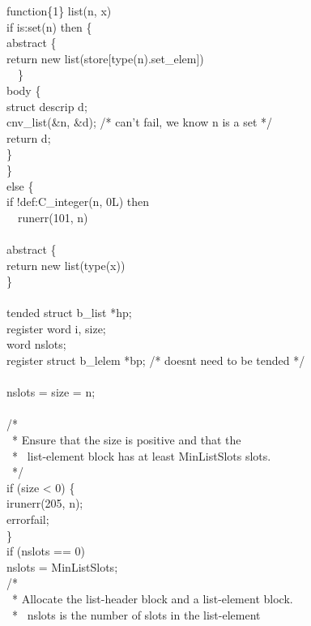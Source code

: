 \begin{iconcode}
function\{1\} list(n, x)\\
\>if is:set(n) then \{\\
\>\>abstract \{\\
\>\>\>return new list(store[type(n).set\_elem])\\
\>\>\ \  \}\\
\>\>body \{\\
\>\>\>struct descrip d;\\
\>\>\>cnv\_list(\&n, \&d); /* can't fail, we know n is a set */\\
\>\>\>return d;\\
\>\>\>\}\\
\>\>\}\\
\>else \{\\
\>\>if !def:C\_integer(n, 0L) then\\
\ \  runerr(101, n)\\
\\
\>abstract \{\\
\>\>return new list(type(x))\\
\>\>\}\\
\\
\>\>tended struct b\_list *hp;\\
\>\>register word i, size;\\
\>\>word nslots;\\
\>\>register struct b\_lelem *bp; /* doesnt need to be tended */\\
\\
\>\>nslots = size = n;\\
\\
\>\>/*\\
\>\>\ * Ensure that the size is positive and that the\\
\>\>\ * \ list-element block has at least MinListSlots slots.\\
\>\>\ */\\
\>\>if (size < 0) \{\\
\>\>\>irunerr(205, n);\\
\>\>\>errorfail;\\
\>\>\>\}\\
\>\>if (nslots == 0)\\
\>\>\>nslots = MinListSlots;\\
\>\>/*\\
\>\>\ * Allocate the list-header block and a list-element block.\\
\>\>\ * \ nslots is the number of slots in the list-element\\

\end{iconcode}

